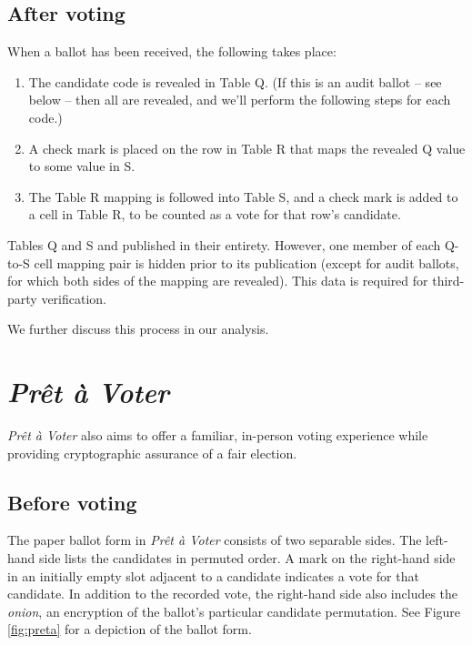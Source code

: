 \documentclass[10pt,twocolumn]{article}
\newcommand{\term}[1]{\textit{#1}}
\newcommand{\preta}{Pr\^{e}t \`{a}}
\newcommand{\pv}{\preta{} Voter}
\begin{document}
\subsection{After voting}

When a ballot has been received, the following takes place:
\begin{enumerate}
	\item
		The candidate code is revealed in Table Q. (If this is an audit ballot -- see below -- then all
		are revealed, and we'll perform the following steps for each code.)
	\item
		A check mark is placed on the row in Table R that maps the revealed Q value to some value in S.
	\item
		The Table R mapping is followed into Table S, and a check mark is added to a cell in Table R,
		to be counted as a vote for that row's candidate.
\end{enumerate}

Tables Q and S and published in their entirety. However, one member of each Q-to-S cell mapping pair
is hidden prior to its publication (except for audit ballots, for which both sides of the mapping
are revealed). This data is required for third-party verification.

We further discuss this process in our analysis.

\section{\term{\pv{}}}

\term{\pv{}} \cite{preta} also aims to offer a familiar, in-person voting experience while providing cryptographic assurance of
a fair election.

\subsection{Before voting}

The paper ballot form in \term{\pv{}} consists of two separable sides.
The left-hand side lists the candidates in permuted order.
A mark on the right-hand side in an initially empty slot adjacent to a candidate indicates a vote for that candidate.
In addition to the recorded vote, the right-hand side also includes the \term{onion}, an encryption of the ballot's particular candidate permutation.
See Figure \ref{fig:preta} for a depiction of the ballot form.
\end{document}
